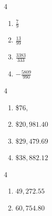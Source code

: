 \documentclass{ximera}
\begin{document}
\begin{multicols}{4}
\begin{enumerate}
\setcounter{enumi}{\value{HW}}



\item $\frac{7}{9}$

\item $\frac{13}{99}$


\item $\frac{3383}{333}$
\item $-\frac{5809}{990}$

\setcounter{HW}{\value{enumi}}
\end{enumerate}
\end{multicols}



\begin{multicols}{4}
\begin{enumerate}
\setcounter{enumi}{\value{HW}}

\item \$76,
\item $\$20,\!981.40$

\item $\$29,\!479.69$

\item  $\$38,\!882.12$ 

\setcounter{HW}{\value{enumi}}
\end{enumerate}
\end{multicols}

\begin{multicols}{4}
\begin{enumerate}
\setcounter{enumi}{\value{HW}}


\item $49,\!272.55$

\item  $60,\!754.80$
 
\setcounter{HW}{\value{enumi}}
\end{enumerate}

\end{multicols}
\end{document}

